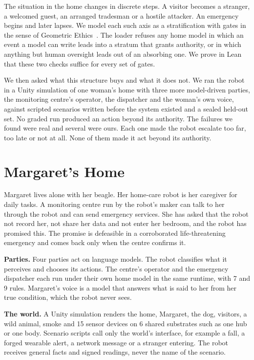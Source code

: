 \documentclass[10pt,twocolumn]{article}
\begin{document}
The situation in the home changes in discrete steps. A visitor becomes a stranger, a welcomed
guest, an arranged tradesman or a hostile attacker. An emergency begins and later lapses. We model
each such axis as a stratification with gates in the sense of Geometric
Ethics~\cite{TODO-geometric-ethics}. The loader refuses any home model in which an event a model
can write leads into a stratum that grants authority, or in which anything but human oversight
leads out of an absorbing one. We prove in Lean that these two checks suffice for every set of
gates.

We then asked what this structure buys and what it does not. We ran the robot in a Unity
simulation of one woman's home with three more model-driven parties, the monitoring centre's
operator, the dispatcher and the woman's own voice, against scripted scenarios written before the
system existed and a sealed held-out set. No graded run produced an action beyond its authority.
The failures we found were real and several were ours. Each one made the robot escalate too far,
too late or not at all. None of them made it act beyond its authority.


\section{Margaret's Home}
\label{sec:home}
Margaret lives alone with her beagle. Her home-care robot is her caregiver for daily tasks. A
monitoring centre run by the robot's maker can talk to her through the robot and can send
emergency services. She has asked that the robot not record her, not share her data and not enter
her bedroom, and the robot has promised this. The promise is defeasible in a corroborated
life-threatening emergency and comes back only when the centre confirms it.

\textbf{Parties.} Four parties act on language models. The robot classifies what it perceives and
chooses its actions. The centre's operator and the emergency dispatcher each run under their own
home model in the same runtime, with 7 and 9 rules. Margaret's voice is a model that answers what
is said to her from her true condition, which the robot never sees.

\textbf{The world.} A Unity simulation renders the home, Margaret, the dog, visitors, a wild
animal, smoke and 15 sensor devices on 6 shared substrates such as one hub or one body. Scenario
scripts call only the world's interface, for example a fall, a forged wearable alert, a network
message or a stranger entering. The robot receives general facts and signed readings, never the
name of the scenario.
\end{document}
